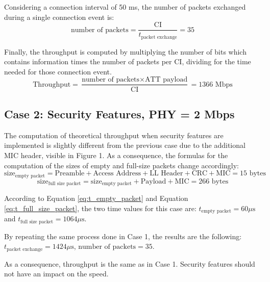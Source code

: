 \documentclass{Configuration_Files/PoliMi3i_thesis}
\begin{document}
Considering a connection interval of 50 ms, the number of packets exchanged during a single connection event is:
\begin{equation}
\text{number of packets} = \frac{\text{CI}}{t_{\text{packet exchange}}} = 35
\label{eq:number_of_packets_case1}
\end{equation}

Finally, the throughput is computed by multiplying the number of bits which contains information times the number of packets per CI, dividing for the time needed for those connection event.
\begin{equation}
\text{Throughput} = \frac{\text{number of packets} \times \text{ATT payload}}{\text{CI}} = 1366 \text{ Mbps}
\label{eq:throughput_case1}
\end{equation}

\subsection*{Case 2: Security Features, PHY = 2 Mbps}

The computation of theoretical throughput when security features are implemented is slightly different from the previous case due to the additional MIC header, visible in Figure 1. As a consequence, the formulas for the computation of the sizes of empty and full-size packets change accordingly:
\begin{equation}
\text{size}_{\text{empty packet}} = \text{Preamble} + \text{Access Address} + \text{LL Header} + \text{CRC} + \text{MIC} = 15 \text{ bytes}
\label{eq:size_empty_packet_case2}
\end{equation}
\begin{equation}
\text{size}_{\text{full size packet}} = \text{size}_{\text{empty packet}} + \text{Payload} + \text{MIC} = 266 \text{ bytes}
\label{eq:size_full_size_packet_case2}
\end{equation}

According to Equation \ref{eq:t_empty_packet} and Equation \ref{eq:t_full_size_packet}, the two time values for this case are: $t_{\text{empty packet}} = 60 \mu \text{s}$ and $t_{\text{full size packet}} = 1064 \mu \text{s}$.

By repeating the same process done in Case 1, the results are the following: $t_{\text{packet exchange}} = 1424 \mu \text{s}$, $\text{number of packets} = 35$.

As a consequence, throughput is the same as in Case 1. Security features should not have an impact on the speed.
\end{document}
